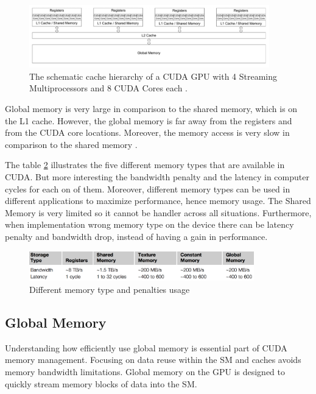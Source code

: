 \begin{figure}[htbp]
	\centering
		\includegraphics[width=0.93\textwidth]{Figures/cores.png}
		\smallskip
	\caption[Schematic cache hierarchy of a CUDA GPU]{The schematic cache hierarchy of a CUDA GPU with 4 Streaming Multiprocessors and 8 CUDA Cores each \cite{cook}.}
	\label{fig:cores}
\end{figure}

Global memory is very large in comparison to the shared memory, which is on the L1 cache. However, the global memory is far away from the registers and from the CUDA core locations. Moreover, the memory access is very slow in comparison to the shared memory \cite{cook}.

The table \ref{fig:memory} illustrates the five different memory types that are available in CUDA. But more interesting the bandwidth penalty and the latency in computer cycles for each on of them. Moreover, different memory types can be used in different applications to maximize performance, hence memory usage. The Shared Memory is very limited so it cannot be handler across all situations. Furthermore, when implementation wrong memory type on the device there can be latency penalty and bandwidth drop, instead of having a gain in performance.
 
\begin{figure}[htbp]
	\centering
		\includegraphics[width=0.87\textwidth]{Figures/memory.png}
		\smallskip
	\caption[Different memory types]{Different memory type and penalties usage \cite{cook}}
	\label{fig:memory}
\end{figure}

\subsection{Global Memory}

Understanding how efficiently use global memory is essential part of CUDA memory management. Focusing on data reuse within the SM and caches avoids memory bandwidth limitations. Global memory on the GPU is designed to quickly stream memory blocks of data into the SM.

